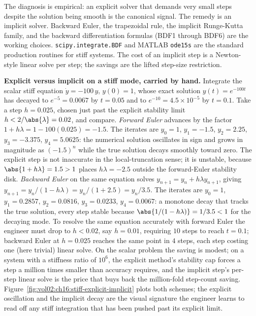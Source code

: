 The diagnosis is empirical: an explicit solver that demands very
small steps despite the solution being smooth is the canonical
signal. The remedy is an implicit solver. Backward Euler, the
trapezoidal rule, the implicit Runge-Kutta family, and the
backward differentiation formulas (BDF1 through BDF6) are the
working choices. \texttt{scipy.integrate.BDF} and MATLAB
\texttt{ode15s} are the standard production routines for stiff
systems. The cost of an implicit step is a Newton-style linear
solve per step; the savings are the lifted step-size restriction.



\begin{example}
\textbf{Explicit versus implicit on a stiff mode, carried by hand.}
Integrate the scalar stiff equation $\dot y = -100\,y$, $y(0) = 1$, whose
exact solution $y(t) = e^{-100 t}$ has decayed to $e^{-5} = 0.0067$ by
$t = 0.05$ and to $e^{-10} = 4.5 \times 10^{-5}$ by $t = 0.1$. Take a step
$h = 0.025$, chosen just past the explicit stability limit $h <
2/\abs{\lambda} = 0.02$, and compare. \emph{Forward Euler} advances by the
factor $1 + h\lambda = 1 - 100(0.025) = -1.5$. The iterates are $y_{0} =
1$, $y_{1} = -1.5$, $y_{2} = 2.25$, $y_{3} = -3.375$, $y_{4} = 5.0625$:
the numerical solution oscillates in sign and grows in magnitude as
$(-1.5)^{n}$ while the true solution decays smoothly toward zero. The
explicit step is not inaccurate in the local-truncation sense; it is
unstable, because $\abs{1 + h\lambda} = 1.5 > 1$ places $h\lambda = -2.5$
outside the forward-Euler stability disk. \emph{Backward Euler} on the same
equation solves $y_{n+1} = y_{n} + h\lambda y_{n+1}$, giving $y_{n+1} =
y_{n}/(1 - h\lambda) = y_{n}/(1 + 2.5) = y_{n}/3.5$. The iterates are
$y_{0} = 1$, $y_{1} = 0.2857$, $y_{2} = 0.0816$, $y_{3} = 0.0233$, $y_{4}
= 0.0067$: a monotone decay that tracks the true solution, every step
stable because $\abs{1/(1 - h\lambda)} = 1/3.5 < 1$ for the decaying mode.
To resolve the same equation accurately with forward Euler the engineer
must drop to $h < 0.02$, say $h = 0.01$, requiring $10$ steps to reach
$t = 0.1$; backward Euler at $h = 0.025$ reaches the same point in $4$
steps, each step costing one (here trivial) linear solve. On the scalar
problem the saving is modest; on a system with a stiffness ratio of
$10^{6}$, the explicit method's stability cap forces a step a million times
smaller than accuracy requires, and the implicit step's per-step linear
solve is the price that buys back the million-fold step-count saving.
Figure~\ref{fig:vol02:ch16:stiff-explicit-implicit} plots both schemes; the
explicit oscillation and the implicit decay are the visual signature the
engineer learns to read off any stiff integration that has been pushed past
its explicit limit.
\end{example}


